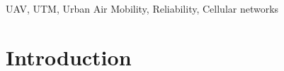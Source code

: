 \documentclass[conference,twocolumn,a4paper]{IEEEtran}
\newcommand{\sofie}[1]{{\color{red}[Sofie: #1]}}
\begin{document}
\begin{IEEEkeywords}
UAV, UTM, Urban Air Mobility, Reliability, Cellular networks
\end{IEEEkeywords}

\section{Introduction}

\end{document}
